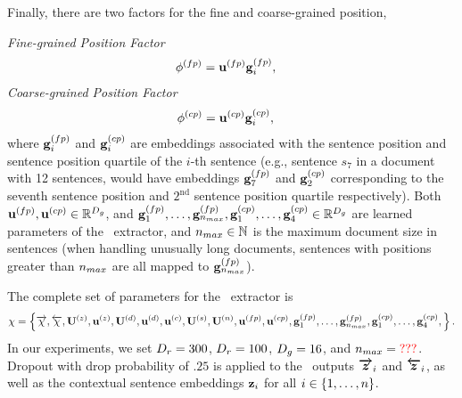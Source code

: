 Finally, there are two factors for the fine and coarse-grained position,

\vspace{10pt} 
\noindent\textit{%
Fine-grained Position Factor}
\begin{align}
       \phi^{(fp)}& = \mathbf{u}^{(fp)} \mathbf{g}^{(fp)}_i, 
\end{align}
\vspace{10pt} \textit{%
Coarse-grained Position Factor}
\begin{align}
           \phi^{(cp)}& = \mathbf{u}^{(cp)} \mathbf{g}^{(cp)}_i, 
\end{align}
where $\mathbf{g}^{(fp)}_i$ and $\mathbf{g}^{(cp)}_i$ are embeddings associated with the sentence position and sentence position quartile of the $i$-th 
sentence (e.g., sentence $s_7$ in a document with 12 sentences, would have 
embeddings $\mathbf{g}^{(fp)}_7$ and $\mathbf{g}^{(cp)}_2$ corresponding
to the seventh sentence position and $2^\textrm{nd}$ sentence position
quartile respectively).
Both $\mathbf{u}^{(fp)}, \mathbf{u}^{(cp)} \in \mathbb{R}^{{D_g}}$, and $\mathbf{g}^{(fp)}_1,\ldots,\mathbf{g}^{(fp)}_{n_{max}},\mathbf{g}^{(cp)}_1,\ldots,\mathbf{g}^{(cp)}_4 \in \mathbb{R}^{{D_g}}$ are learned parameters of the \srext~extractor, and ${n_{max}}\in\mathbb{N}$ is the maximum
document size in sentences (when handling unusually long documents, sentences
with positions greater than ${n_{max}}$ are all mapped to $\mathbf{g}^{(fp)}_{n_{max}}$).

The complete set of parameters for the \srext~extractor is 
\[\chi = \left\{\overrightarrow{\chi},\overleftarrow{\chi},\mathbf{U}^{(z)},\mathbf{u}^{(z)},
\mathbf{U}^{(d)},\mathbf{u}^{(d)}, \mathbf{u}^{(c)}, \mathbf{U}^{(s)}, \mathbf{U}^{(n)},
\mathbf{u}^{(fp)}, \mathbf{u}^{(cp)}, \mathbf{g}^{(fp)}_1,\ldots,\mathbf{g}^{(fp)}_{{n_{max}}}, \mathbf{g}^{(cp)}_1,\ldots,\mathbf{g}^{(cp)}_4,\right\}. \]
In our experiments, we set ${D_r}=300$, ${D_r}=100$, ${D_g}=16$,
and ${n_{max}}={\color{red}???}$. Dropout with drop probability of $.25$
is applied to the \gru~outputs $\boldsymbol{\overrightarrow{z}}_i$ and $\boldsymbol{\overleftarrow{z}}_i$, as well as 
the contextual sentence embeddings $\mathbf{z}_i$ for all $i \in \{1,\ldots,n\}$.



















